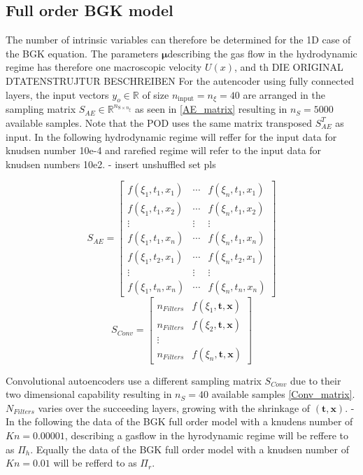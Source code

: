 \subsection{Full order BGK model}\label{Sec: Data Sampling}
The number of intrinsic variables can therefore be determined for the 1D case of the BGK equation. The parameters \(\mathbf{\mu}\)describing the gas flow in the hydrodynamic regime has therefore one macroscopic velocity \(U(x)\), and th
DIE ORIGINAL DTATENSTRUJTUR BESCHREIBEN
For the autencoder using fully connected layers, the input vectors $y_o \in \mathbb{R}$ of size $n_{\text{input}} = n_{\xi} = 40$ are arranged in the sampling matrix $S_{AE} \in \mathbb{R}^{n_{\mathrm{S}\times n_\xi}}$ as seen in \cref{AE_matrix} resulting in $n_S = 5000$ available samples. Note that the POD uses the same matrix transposed $S_{AE}^T$ as input. In the following hydrodynamic regime will reffer for the input data for knudsen number 10e-4 and rarefied regime will refer to the input data for knudsen numbers 10e2.
- insert unshuffled set pls
\begin{multicols}{2}
	\begin{equation}
	S_{AE} = \begin{bmatrix}
	f(\xi_1,t_1,x_1)&\cdots &f(\xi_n,t_1,x_1) \\
	f(\xi_1,t_1,x_2)&\cdots &f(\xi_n,t_1,x_2) \\
	\vdots& \vdots & \vdots\\
	f(\xi_1,t_1,x_n)&\cdots &f(\xi_n,t_1,x_n)\\
	f(\xi_1,t_2,x_1)&\cdots &f(\xi_n,t_2,x_1)\\
	\vdots & \vdots & \vdots\\
	f(\xi_1,t_n,x_n)&\cdots &f(\xi_n,t_n,x_n)
	\end{bmatrix}
	\label{AE_matrix}
	\end{equation}\break
	\begin{equation}
	S_{Conv}= \begin{bmatrix}
	n_{Filters}&f(\xi_1,\textbf{t},\textbf{x})\\
	n_{Filters}&f(\xi_2,\textbf{t},\textbf{x})\\
	\vdots\\
	n_{Filters}&f(\xi_n,\textbf{t},\textbf{x})
	\end{bmatrix}
	\label{Conv_matrix}
	\end{equation}
\end{multicols}\noindent
Convolutional autoencoders use a different sampling matrix $S_{Conv}$ due to their two dimensional capability resulting in $n_S = 40$ available samples \cref{Conv_matrix}.$N_{Filters}$ varies over the succeeding layers, growing with the shrinkage of $(\textbf{t},\textbf{x})$.
- In the following the data of the BGK full order model with a knudens number of \(Kn = 0.00001\), describing a gasflow in the hyrodynamic regime will be reffere to as \(\Pi_h\). Equally the data of the BGK full order model with a knudsen number of \(Kn = 0.01\) will be refferd to as \(\Pi_r\).

